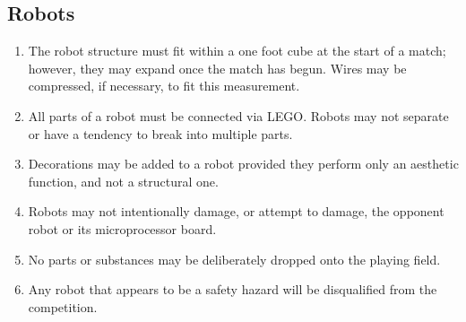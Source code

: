 \subsection{Robots}
\begin{enumerate}

\item The robot structure must fit within a one foot cube at the start of a
match; however, they may expand once the match has begun.  Wires may be
compressed, if necessary, to fit this measurement.

\item All parts of a robot must be connected via LEGO. Robots may not separate
or have a tendency to break into multiple parts.

\item Decorations may be added to a robot provided they perform only an
aesthetic function, and not a structural one.

\item Robots may not intentionally damage, or attempt to damage, the opponent
robot or its microprocessor board.

\item No parts or substances may be deliberately dropped onto the playing field.

\item Any robot that appears to be a safety hazard will be disqualified from the
competition.

\end{enumerate}

